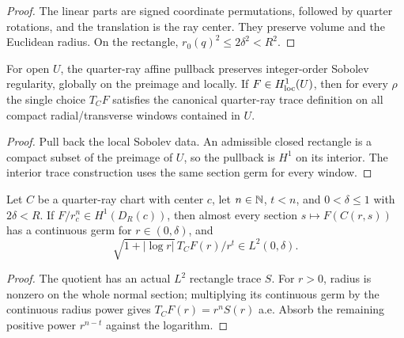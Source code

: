 \begin{proof}
\leanok
The linear parts are signed coordinate permutations, followed by quarter
rotations, and the translation is the ray center.
They preserve volume and the Euclidean radius.
On the rectangle, $r_0(q)^2\le2\delta^2<R^2$.
\end{proof}

\begin{lemma}
\label{lem:quarter-ray-interior-trace}
\leanok
For open $U$, the quarter-ray affine pullback preserves integer-order
Sobolev regularity, globally on the preimage and locally.
If $F\in H^1_{\rm loc}(U)$, then for every $\rho$ the single choice $T_C F$
satisfies the canonical quarter-ray trace definition on all compact
radial/transverse windows contained in $U$.
\end{lemma}

\begin{proof}
\leanok
Pull back the local Sobolev data.
An admissible closed rectangle is a compact subset of the preimage of $U$,
so the pullback is $H^1$ on its interior.
The interior trace construction uses the same section germ for every window.
\end{proof}

\begin{lemma}
\label{lem:quarter-ray-radial-trace}
\leanok
Let $C$ be a quarter-ray chart with center $c$, let $n\in\mathbb{N}$, $t<n$,
and $0<\delta\le1$ with $2\delta<R$.
If $F/r_c^n\in H^1(D_R(c))$, then almost every section
$s\mapsto F(C(r,s))$ has a continuous germ for $r\in(0,\delta)$, and
\[
 \sqrt{1+|\log r|}\,T_C F(r)/r^t\in L^2(0,\delta).
\]
\end{lemma}

\begin{proof}
\leanok
The quotient has an actual $L^2$ rectangle trace $S$.
For $r>0$, radius is nonzero on the whole normal section; multiplying
its continuous germ by the continuous radius power gives
$T_C F(r)=r^nS(r)$ a.e.
Absorb the remaining positive power $r^{n-t}$ against the logarithm.
\end{proof}

